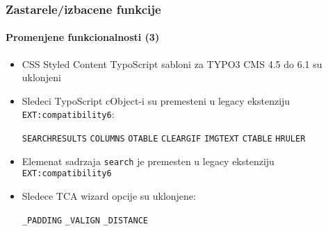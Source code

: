 \begin{frame}[fragile]
	\frametitle{Zastarele/izbacene funkcije}
	\framesubtitle{Promenjene funkcionalnosti (3)}

	\begin{itemize}
		\item CSS Styled Content TypoScript sabloni za TYPO3 CMS 4.5 do 6.1 su uklonjeni

		\item Sledeci TypoScript cObject-i su premesteni u legacy ekstenziju
			\texttt{EXT:compatibility6}:

			\vspace{0.2cm}

			\small
				\texttt{SEARCHRESULTS} \tabto{3cm}\texttt{COLUMNS} \tabto{6cm}\texttt{OTABLE} \tabto{9cm}\texttt{CLEARGIF}\newline
				\texttt{IMGTEXT}       \tabto{3cm}\texttt{CTABLE}  \tabto{6cm}\texttt{HRULER}
			\normalsize

		\item Elemenat sadrzaja \texttt{search} je premesten u legacy ekstenziju \texttt{EXT:compatibility6}

		\item Sledece TCA wizard opcije su uklonjene:

			\vspace{0.2cm}

			\small
				\texttt{\_PADDING} \tabto{3cm}\texttt{\_VALIGN} \tabto{6cm}\texttt{\_DISTANCE}
			\normalsize

	\end{itemize}

\end{frame}


